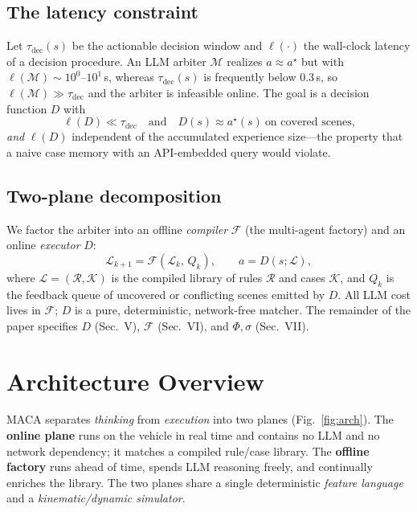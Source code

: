 \documentclass[conference]{IEEEtran}
\begin{document}
\subsection{The latency constraint}
Let $\tau_{\mathrm{dec}}(s)$ be the actionable decision window and
$\ell(\cdot)$ the wall-clock latency of a decision procedure. An LLM
arbiter $\mathcal{M}$ realizes $a\approx a^\star$ but with
$\ell(\mathcal{M})\sim 10^0$--$10^1$\,s, whereas
$\tau_{\mathrm{dec}}(s)$ is frequently below $0.3$\,s, so
$\ell(\mathcal{M})\gg\tau_{\mathrm{dec}}$ and the arbiter is infeasible online.
The goal is a decision function $D$ with
\begin{equation}
\ell(D)\ll\tau_{\mathrm{dec}}
\quad\text{and}\quad
D(s)\approx a^\star(s)\ \text{on covered scenes,}
\end{equation}
\emph{and} $\ell(D)$ independent of the accumulated experience size---the
property that a naive case memory with an API-embedded query would violate.

\subsection{Two-plane decomposition}
We factor the arbiter into an offline \emph{compiler} $\mathcal{F}$ (the
multi-agent factory) and an online \emph{executor} $D$:
\begin{equation}
\mathcal{L}_{k+1}=\mathcal{F}(\mathcal{L}_k,\,Q_k),\qquad
a=D(s;\mathcal{L}),
\end{equation}
where $\mathcal{L}=(\mathcal{R},\mathcal{K})$ is the compiled library of rules
$\mathcal{R}$ and cases $\mathcal{K}$, and $Q_k$ is the feedback queue of
uncovered or conflicting scenes emitted by $D$. All LLM cost lives in
$\mathcal{F}$; $D$ is a pure, deterministic, network-free matcher. The
remainder of the paper specifies $D$ (Sec.~V), $\mathcal{F}$ (Sec.~VI), and
$\Phi,\sigma$ (Sec.~VII).

\section{Architecture Overview}

MACA separates \emph{thinking} from \emph{execution} into two planes
(Fig.~\ref{fig:arch}). The \textbf{online plane} runs on the vehicle in real
time and contains no LLM and no network dependency; it matches a compiled
rule/case library. The \textbf{offline factory} runs ahead of time, spends
LLM reasoning freely, and continually enriches the library. The two planes
share a single deterministic \emph{feature language} and a
\emph{kinematic/dynamic simulator}.
\end{document}
